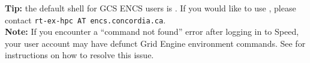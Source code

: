 \noindent \textbf{Tip:} the default shell for GCS ENCS users is .
If you would like to use , please contact \texttt{rt-ex-hpc AT encs.concordia.ca}.\\






%

\noindent \textbf{Note:} If you encounter a ``command not found'' error after logging in to Speed, 
your user account may have defunct Grid Engine environment commands. 
See  for instructions on how to resolve this issue.
